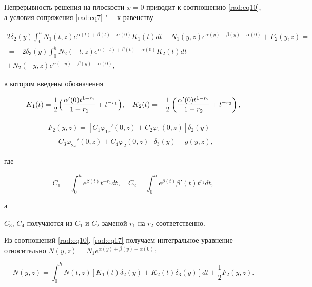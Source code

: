 
Непрерывность решения на плоскости $x=0$ приводит к соотношению \eqref{rad:eq10}, а условия сопряжения \eqref{rad:eq7} "--- к равенству

\begin{multline}

\label{rad:eq17}

2\delta_2(y)  \int _0^h N_1(t,z) e^{\alpha(t)+\beta(t)-\alpha(0)} K_1(t)dt - N_1(y,z) e^{\alpha(y)+\beta(y)-\alpha(0)} + F_2(y,z) = \\

= - 2\delta_3(y)  \int _0^h N_2(-t,z) e^{\alpha(-t)+\beta(t)-\alpha(0)} K_2(t)dt + \\ + N_2(-y,z) e^{\alpha(-y)+\beta(y)-\alpha(0)},

\end{multline}

в котором введены обозначения

$$ 

K_1(t)=\frac{1}{2} \Bigl(\frac{\alpha'(0) t^{1-r_1}}{1-r_1} + t^{-r_1}\Bigr), 

\quad 

K_2(t)= -  \frac{1}{2} \left(\frac{\alpha'(0) t^{1-r_2}}{1-r_2} + t^{-r_2}\right), $$

\begin{multline} 

F_2(y,z) = [C_1\varphi_{1x}'(0,z) + C_2\varphi_{1}(0,z)]\delta_2(y) - \\

 - [C_3\varphi_{2x}'(0,z) + C_4\varphi_{2}(0,z)]\delta_3(y) - g(y,z), 

 \end{multline}

где

$$ C_1= \int _0^h e^{\beta(t)} t^{-r_1} dt, \quad C_2= \int _0^h e^{\beta(t)} \beta'(t) t^{r_1} dt, $$

а

$C_3$, $C_4$ получаются из $C_1$ и $C_2$ заменой $r_1$ на $r_2$ соответственно.



Из соотношений \eqref{rad:eq10}, \eqref{rad:eq17} получаем интегральное уравнение относительно $N(y,z)=N_1 e^{\alpha(y)+\beta(y)-\alpha(0)}$:

\begin{equation}\label{rad:eq18}

N(y,z) =  \int _0^h N(t,z) [K_1(t)\delta_2(y)+ K_2(t)\delta_3(y)]dt +\frac{1}{2} F_2(y,z).

\end{equation}



